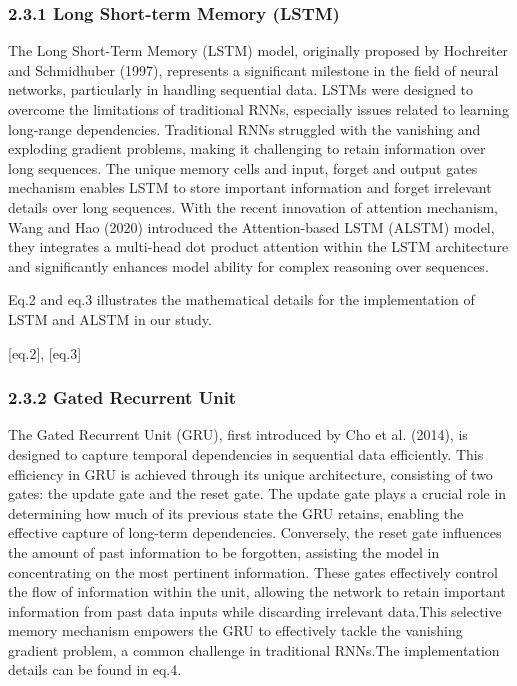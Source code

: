 \documentclass[10pt,letterpaper]{article}
\begin{document}
\subsubsection*{2.3.1 Long Short-term Memory (LSTM)}
The Long Short-Term Memory (LSTM) model, originally proposed by Hochreiter and Schmidhuber (1997), represents a significant milestone in the field of neural networks, particularly in handling sequential data. LSTMs were designed to overcome the limitations of traditional RNNs, especially issues related to learning long-range dependencies. Traditional RNNs struggled with the vanishing and exploding gradient problems, making it challenging to retain information over long sequences. The unique memory cells and input, forget and output gates mechanism enables LSTM to store important information and forget irrelevant details over long sequences. With the recent innovation of attention mechanism, Wang and Hao (2020) introduced the Attention-based LSTM (ALSTM) model, they integrates a multi-head dot product attention within the LSTM architecture and significantly enhances model ability for complex reasoning over sequences.



Eq.2 and eq.3 illustrates the mathematical details for the implementation of LSTM and ALSTM in our study.


[eq.2], [eq.3]

\subsubsection*{2.3.2 Gated Recurrent Unit}
 The Gated Recurrent Unit (GRU), first introduced by Cho et al. (2014), is designed to capture temporal dependencies in sequential data efficiently. This efficiency in GRU is achieved through its unique architecture, consisting of two gates: the update gate and the reset gate. The update gate plays a crucial role in determining how much of its previous state the GRU retains, enabling the effective capture of long-term dependencies. Conversely, the reset gate influences the amount of past information to be forgotten, assisting the model in concentrating on the most pertinent information. These gates effectively control the flow of information within the unit, allowing the network to retain important information from past data inputs while discarding irrelevant data.This selective memory mechanism empowers the GRU to effectively tackle the vanishing gradient problem, a common challenge in traditional RNNs.The implementation details can be found in eq.4.
\end{document}
